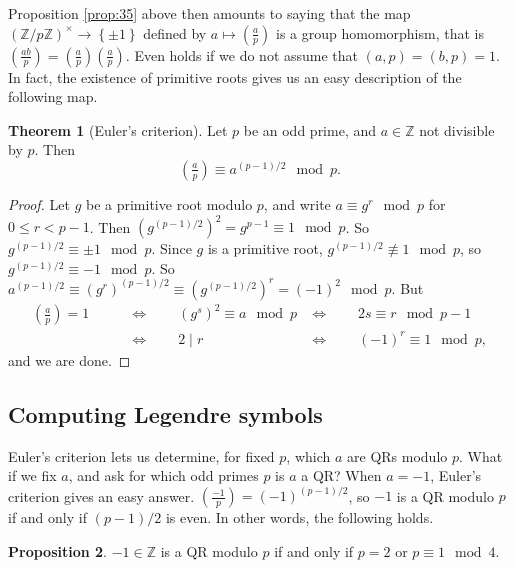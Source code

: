 \documentclass{article}
\newcommand{\Z}{\mathbb{Z}}
\newcommand{\rb}[1]{\left( #1 \right)}
\newcommand{\cb}[1]{\left\{ #1 \right\}}
\newcommand{\unit}[1]{\rb{\Z / #1\Z}^\times}
\newcommand{\legendre}[2]{\rb{\tfrac{#1}{#2}}}
\theoremstyle{definition}\newtheorem{definition}{Definition}
\theoremstyle{definition}\newtheorem{remark}[definition]{Remark}
\theoremstyle{definition}\newtheorem*{example}{Example}
\theoremstyle{definition}\newtheorem*{note}{Note}
\newtheorem{proposition}[definition]{Proposition}
\newtheorem{theorem}[definition]{Theorem}
\begin{document}
Proposition \ref{prop:35} above then amounts to saying that the map $ \unit{p} \to \cb{\pm 1} $ defined by $ a \mapsto \legendre{a}{p} $ is a group homomorphism, that is $ \legendre{ab}{p} = \legendre{a}{p}\legendre{a}{p} $. Even holds if we do not assume that $ \rb{a, p} = \rb{b, p} = 1 $. In fact, the existence of primitive roots gives us an easy description of the following map.


\begin{theorem}[Euler's criterion]
Let $ p $ be an odd prime, and $ a \in \Z $ not divisible by $ p $. Then
$$ \legendre{a}{p} \equiv a^{\rb{p - 1} / 2} \mod p. $$
\end{theorem}

\begin{proof}
Let $ g $ be a primitive root modulo $ p $, and write $ a \equiv g^r \mod p $ for $ 0 \le r < p - 1 $. Then $ \rb{g^{\rb{p - 1} / 2}}^2 = g^{p - 1} \equiv 1 \mod p $. So $ g^{\rb{p - 1} / 2} \equiv \pm 1 \mod p $. Since $ g $ is a primitive root, $ g^{\rb{p - 1} / 2} \not\equiv 1 \mod p $, so $ g^{\rb{p - 1} / 2} \equiv -1 \mod p $. So $ a^{\rb{p - 1} / 2} \equiv \rb{g^r}^{\rb{p - 1} / 2} \equiv \rb{g^{\rb{p - 1} / 2}}^r = \rb{-1}^2 \mod p $. But
\begin{align*}
\legendre{a}{p} = 1 \qquad
& \iff \qquad \rb{g^s}^2 \equiv a \mod p
& \iff \qquad 2s \equiv r \mod p - 1 \\
& \iff \qquad 2 \mid r
& \iff \qquad \rb{-1}^r \equiv 1 \mod p,
\end{align*}
and we are done.
\end{proof}

\subsection{Computing Legendre symbols}

Euler's criterion lets us determine, for fixed $ p $, which $ a $ are QRs modulo $ p $. What if we fix $ a $, and ask for which odd primes $ p $ is $ a $ a QR? When $ a = -1 $, Euler's criterion gives an easy answer. $ \legendre{-1}{p} = \rb{-1}^{\rb{p - 1} / 2} $, so $ -1 $ is a QR modulo $ p $ if and only if $ \rb{p - 1} / 2 $ is even. In other words, the following holds.

\begin{proposition}
$ -1 \in \Z $ is a QR modulo $ p $ if and only if $ p = 2 $ or $ p \equiv 1 \mod 4 $.
\end{proposition}
\end{document}
